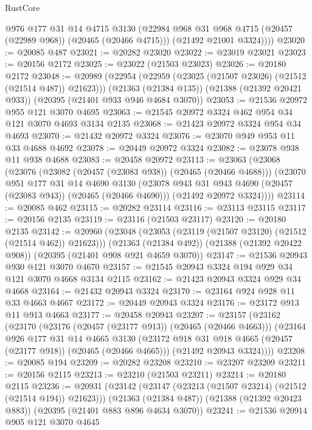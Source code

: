 \begin{lexlean}{RustCore}
\begin{coremodule}
          @976
          @177
          @31
          @14
          @4715
          @3130
          (@22984 @968 @31 @968 @4715 (@20457 (@22989 @968)) (@20465 (@20466 @4715)))
          (@21492 @21001 @3324))))
@23020 := @20085 @487
@23021 := @20282 @23020
@23022 := @23019 @23021
@23023 := @20156 @2172
@23025 := @23022 (@21503 @23023)
@23026 := @20180 @2172
@23048 := @20989
    (@22954 (@22959 (@23025 (@21507 @23026) (@21512 (@21514 @487)) @21623)))
    (@21363 (@21384 @135))
    (@21388 (@21392 @20421 @933))
    (@20395 (@21401 @933 @946 @4684 @3070))
@23053 := @21536 @20972 @955 @121 @3070 @4695
@23063 := @21545 @20972 @3324 @462 @954 @34 @121 @3070 @4693 @3134 @2135
@23068 := @21423 @20972 @3324 @954 @34 @4693
@23070 := @21432 @20972 @3324
@23076 := @23070 @949 @953 @11 @33 @4688 @4692
@23078 := @20449 @20972 @3324
@23082 := @23078 @938 @11 @938 @4688
@23083 := @20458 @20972
@23113 := @23063
    (@23068
      (@23076
        (@23082 (@20457 (@23083 @938)) (@20465 (@20466 @4688)))
        (@23070
          @951
          @177
          @31
          @14
          @4690
          @3130
          (@23078 @943 @31 @943 @4690 (@20457 (@23083 @943)) (@20465 (@20466 @4690)))
          (@21492 @20972 @3324))))
@23114 := @20085 @462
@23115 := @20282 @23114
@23116 := @23113 @23115
@23117 := @20156 @2135
@23119 := @23116 (@21503 @23117)
@23120 := @20180 @2135
@23142 := @20960
    (@23048 (@23053 (@23119 (@21507 @23120) (@21512 (@21514 @462)) @21623)))
    (@21363 (@21384 @492))
    (@21388 (@21392 @20422 @908))
    (@20395 (@21401 @908 @921 @4659 @3070))
@23147 := @21536 @20943 @930 @121 @3070 @4670
@23157 := @21545 @20943 @3324 @194 @929 @34 @121 @3070 @4668 @3134 @2115
@23162 := @21423 @20943 @3324 @929 @34 @4668
@23164 := @21432 @20943 @3324
@23170 := @23164 @924 @928 @11 @33 @4663 @4667
@23172 := @20449 @20943 @3324
@23176 := @23172 @913 @11 @913 @4663
@23177 := @20458 @20943
@23207 := @23157
    (@23162
      (@23170
        (@23176 (@20457 (@23177 @913)) (@20465 (@20466 @4663)))
        (@23164
          @926
          @177
          @31
          @14
          @4665
          @3130
          (@23172 @918 @31 @918 @4665 (@20457 (@23177 @918)) (@20465 (@20466 @4665)))
          (@21492 @20943 @3324))))
@23208 := @20085 @194
@23209 := @20282 @23208
@23210 := @23207 @23209
@23211 := @20156 @2115
@23213 := @23210 (@21503 @23211)
@23214 := @20180 @2115
@23236 := @20931
    (@23142 (@23147 (@23213 (@21507 @23214) (@21512 (@21514 @194)) @21623)))
    (@21363 (@21384 @487))
    (@21388 (@21392 @20423 @883))
    (@20395 (@21401 @883 @896 @4634 @3070))
@23241 := @21536 @20914 @905 @121 @3070 @4645

\end{coremodule}
\end{lexlean}
